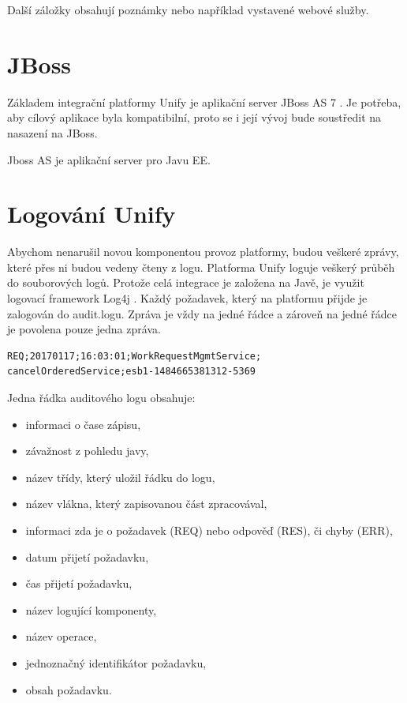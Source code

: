 \documentclass[thesis=M,czech]{FITthesis}[2012/10/20]
\begin{document}
			Další záložky obsahují poznámky nebo například vystavené webové služby.
			
			
		
	\section{JBoss}
		\label{sec:jboss}
		Základem integrační platformy Unify je aplikační server JBoss AS 7 \cite{unify}. Je potřeba, aby cílový aplikace byla kompatibilní, proto se i její vývoj bude soustředit na nasazení na JBoss.
		
		Jboss AS je aplikační server pro Javu EE\cite{jboss}.

					
	\section{Logování Unify}
		\label{sec:logging_unify}
		Abychom nenarušil novou komponentou provoz platformy, budou veškeré zprávy, které přes ni budou vedeny čteny z logu. Platforma Unify loguje veškerý průběh do souborových logů. Protože celá integrace je založena na Javě, je využit logovací framework Log4j \cite{log4j}.
		Každý požadavek, který na platformu přijde je zalogován do audit.logu. Zpráva je vždy na jedné řádce a zároveň na jedné řádce je povolena pouze jedna zpráva.
		
		\begin{minipage}{\linewidth}
			\begin{lstlisting}[caption={Část řádky v auditovém logu Unify}, label={lst:log}]
REQ;20170117;16:03:01;WorkRequestMgmtService;
cancelOrderedService;esb1-1484665381312-5369
			\end{lstlisting}
		\end{minipage}
		
		Jedna řádka auditového logu obsahuje:
		
		\begin{itemize} 
			\item informaci o čase zápisu,
			\item závažnost z pohledu javy, 
			\item název třídy, který uložil řádku do logu,
			\item název vlákna, který zapisovanou část zpracovával,
			\item informaci zda je o požadavek (REQ) nebo odpověď (RES), či chyby (ERR),
			\item datum přijetí požadavku,
			\item čas přijetí požadavku,
			\item název logující komponenty,
			\item název operace,
			\item jednoznačný identifikátor požadavku,
			\item obsah požadavku.		
		\end{itemize}
		
\end{document}

